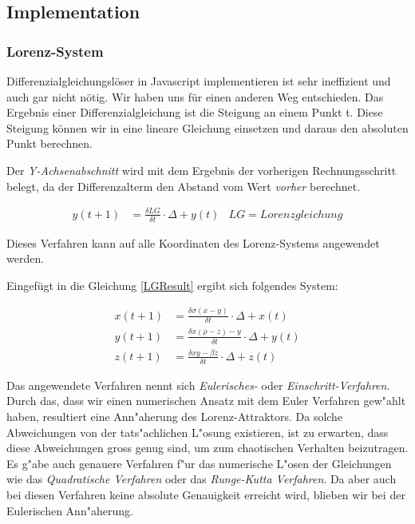 \subsection{Implementation}

\subsubsection{Lorenz-System}
Differenzialgleichungslöser in Javascript implementieren ist sehr ineffizient und auch gar nicht nötig. Wir haben uns für einen anderen Weg entschieden. Das Ergebnis einer Differenzialgleichung ist die Steigung an einem Punkt t. Diese Steigung können wir in eine lineare Gleichung einsetzen und daraus den absoluten Punkt berechnen.

Der \textit{Y-Achsenabschnitt} wird mit dem Ergebnis der vorherigen Rechnungsschritt belegt, da der Differenzalterm den Abstand vom Wert \textit{vorher} berechnet.  

\begin{align}
\label{LGResult}
y(t + 1) &= \frac{\delta LG}{\delta t} \cdot  \Delta + y(t) & LG = Lorenzgleichung
\end{align}

Dieses Verfahren kann auf alle Koordinaten des Lorenz-Systems angewendet werden.

Eingefügt in die Gleichung \eqref{LGResult} ergibt sich folgendes System:

\begin{align}
x(t + 1) &= \frac{\delta \sigma(x - y)}{\delta t} \cdot \Delta + x(t)\\
y(t + 1) &= \frac{\delta x(\rho - z) - y}{\delta t} \cdot \Delta + y(t)\\
z(t + 1) &= \frac{\delta xy - \beta z}{\delta t} \cdot \Delta + z(t)
\end{align}

Das angewendete Verfahren nennt sich \textit{Eulerisches-} oder \textit{Einschritt-Verfahren}. Durch das, dass wir einen numerischen Ansatz mit dem Euler Verfahren gew"ahlt haben, resultiert eine Ann"aherung des Lorenz-Attraktors. Da solche Abweichungen von der tats"achlichen L"osung existieren, ist zu erwarten, dass diese Abweichungen gross genug sind, um zum chaotischen Verhalten beizutragen. Es g"abe auch genauere Verfahren f"ur das numerische L"osen der Gleichungen wie das \textit{Quadratische Verfahren} oder das \textit{Runge-Kutta Verfahren}. Da aber auch bei diesen Verfahren keine absolute Genauigkeit erreicht wird, blieben wir bei der Eulerischen Ann"aherung. 

